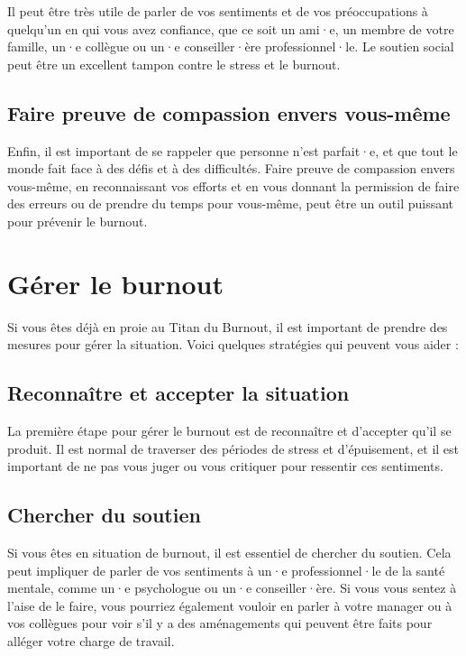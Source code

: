 Il peut être très utile de parler de vos sentiments et de vos préoccupations à quelqu'un en qui vous avez confiance, que ce soit un ami·e, un membre de votre famille, un·e collègue ou un·e conseiller·ère professionnel·le. Le soutien social peut être un excellent tampon contre le stress et le burnout.

\subsection{Faire preuve de compassion envers vous-même}

Enfin, il est important de se rappeler que personne n'est parfait·e, et que tout le monde fait face à des défis et à des difficultés. Faire preuve de compassion envers vous-même, en reconnaissant vos efforts et en vous donnant la permission de faire des erreurs ou de prendre du temps pour vous-même, peut être un outil puissant pour prévenir le burnout.

\section{Gérer le burnout}

Si vous êtes déjà en proie au Titan du Burnout, il est important de prendre des mesures pour gérer la situation. Voici quelques stratégies qui peuvent vous aider :

\subsection{Reconnaître et accepter la situation}

La première étape pour gérer le burnout est de reconnaître et d'accepter qu'il se produit. Il est normal de traverser des périodes de stress et d'épuisement, et il est important de ne pas vous juger ou vous critiquer pour ressentir ces sentiments.

\subsection{Chercher du soutien}

Si vous êtes en situation de burnout, il est essentiel de chercher du soutien. Cela peut impliquer de parler de vos sentiments à un·e professionnel·le de la santé mentale, comme un·e psychologue ou un·e conseiller·ère. Si vous vous sentez à l'aise de le faire, vous pourriez également vouloir en parler à votre manager ou à vos collègues pour voir s'il y a des aménagements qui peuvent être faits pour alléger votre charge de travail.

